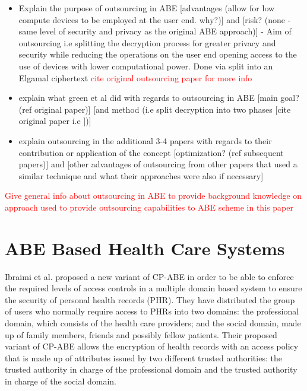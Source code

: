 \begin{itemize}
	\item Explain the purpose of outsourcing in ABE [advantages (allow for low compute devices to be employed at the user end. why?)] and [risk? (none - same level of security and privacy as the original ABE approach)] - Aim of outsourcing i.e splitting the decryption process for greater privacy and security while reducing the operations on the user end opening access to the use of devices with lower computational power. Done via split into an Elgamal ciphertext \textcolor{red}{cite original outsourcing paper for more info}
	
	\item explain what green et al did with regards to outsourcing in ABE [main goal? (ref original paper\cite{Green2011outsource})] [and method (i.e split decryption into two phases [cite original paper i.e \cite{Green2011outsource}])]
	
	\item explain outsourcing in the additional 3-4 papers with regards to their contribution or application of the concept [optimization? (ref subsequent papers)] and [other advantages of outsourcing from other papers that used a similar technique and what their approaches were also if necessary]
\end{itemize}

\textcolor{red}{Give general info about outsourcing in ABE to provide background knowledge on approach used to provide outsourcing capabilities to ABE scheme in this paper}



\section{ABE Based Health Care Systems}

Ibraimi et al. proposed a new variant of CP-ABE \cite{Ibraimi2010} in order to be able to enforce the required levels of access controls in a multiple domain based system to ensure the security of personal health records (PHR). They have distributed the group of users who normally require access to PHRs into two domains: the professional domain, which consists of the health care providers; and the social domain, made up of family members, friends and possibly fellow patients. Their proposed variant of CP-ABE allows the encryption of health records with an access policy that is made up of attributes issued by two different trusted authorities: the trusted authority in charge of the professional domain and the trusted authority in charge of the social domain.

